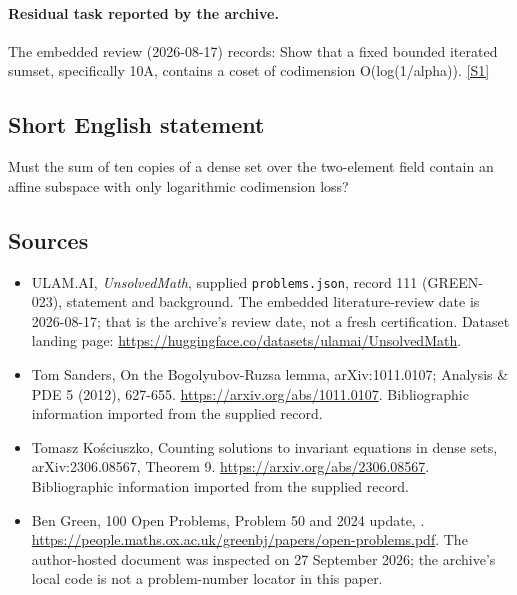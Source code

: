 \documentclass[11pt,a4paper]{article}
\newcommand{\sref}[2]{\hyperlink{source:#1:#2}{[S#2]}}
\begin{document}
\paragraph{Residual task reported by the archive.}

The embedded review (2026-08-17) records: Show that a fixed bounded iterated sumset, specifically 10A, contains a coset of codimension O(log(1/alpha)). \sref{111}{1}

\subsection{Short English statement}

Must the sum of ten copies of a dense set over the two-element field contain an affine subspace with only logarithmic codimension loss?

\subsection{Sources}

{\small

\begin{itemize}

\item[\hypertarget{source:111:1}{S1}] ULAM.AI, \emph{UnsolvedMath}, supplied \texttt{problems.json}, record 111 (GREEN-023), statement and background. The embedded literature-review date is 2026-08-17; that is the archive’s review date, not a fresh certification. Dataset landing page: \url{https://huggingface.co/datasets/ulamai/UnsolvedMath}.

\item[\hypertarget{source:111:2}{S2}] Tom Sanders, On the Bogolyubov-Ruzsa lemma, arXiv:1011.0107; Analysis \& PDE 5 (2012), 627-655. \url{https://arxiv.org/abs/1011.0107}. Bibliographic information imported from the supplied record.

\item[\hypertarget{source:111:3}{S3}] Tomasz Kościuszko, Counting solutions to invariant equations in dense sets, arXiv:2306.08567, Theorem 9. \url{https://arxiv.org/abs/2306.08567}. Bibliographic information imported from the supplied record.

\item[\hypertarget{source:111:4}{S4}] Ben Green, 100 Open Problems, Problem 50 and 2024 update, . \url{https://people.maths.ox.ac.uk/greenbj/papers/open-problems.pdf}. The author-hosted document was inspected on 27 September 2026; the archive’s local code is not a problem-number locator in this paper.

\end{itemize}

}

\label{end:111}
\end{document}
